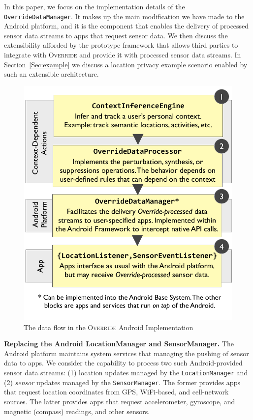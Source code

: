 \documentclass[10pt]{sensys-proc}
\begin{document}
In this paper, we focus on the implementation details of the \texttt{OverrideDataManager}. It makes up the main modification we have made to the Android platform, and it is the component that enables the delivery of processed sensor data streams to apps that request sensor data. We then discuss the extensibility afforded by the prototype framework that allows third parties to integrate with \textsc{Override} and provide it with processed sensor data streams. In Section~\ref{Sec:example} we discuss a location privacy example scenario enabled by such an extensible architecture.

\begin{figure}
\includegraphics[width=\columnwidth]{../figures/android_impl4.pdf}
\caption{The data flow in the \textsc{Override} Android Implementation}
\label{fig:android_impl}
\end{figure}

\textbf{Replacing the Android LocationManager and SensorManager.} The Android platform maintains system services that managing the pushing of sensor data to apps. We consider the capability to process two such Android-provided sensor data streams: (1) location updates managed by the \texttt{LocationManager} and (2) \emph{sensor} updates managed by the \texttt{SensorManager}. The former provides apps that request location coordinates from GPS, WiFi-based, and cell-network sources. The latter provides apps that request accelerometer, gyroscope, and magnetic (compass) readings, and other sensors.
\end{document}
